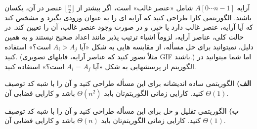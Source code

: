 \documentclass{article}
\begin{document}
آرایه 
$A[0\cdots n-1]$
 شامل «عنصر غالب» است، اگر بیشتر از 
$\lfloor\frac{n}{2}\rfloor$
عنصر در آن، یکسان باشند. الگوریتمی
کارا طراحی کنید که آرایه ای را به عنوان ورودی بگیرد و مشخص کند که آیا آرایه، عنصر غالب دارد یا خیر، و در 
صورت وجود عنصر غالب، آن را تعیین کند. در حالت کلی، عناصر آرایه، لزوماً اشیاء ترتیب پذیر مانند اعداد 
صحیح نیستند و به همین دلیل، نمیتوانید برای حل مسأله، از مقایسه هایی به شکل
 «آیا 
 $A_i>A_j$
  است؟» 
استفاده کنید. (مثلاً تصور کنید که عناصر آرایه، فایلهای تصویری GIF باشند.) اما شما میتوانید در الگوریتم از 
پرسشهایی به شکل «آیا 
$A_i=A_j$
 است؟» استفاده کنید.
\vspace{2.5pt}

\textbf{الف)}
الگوریتمی ساده اندیشانه
برای این مسأله طراحی کنید و آن را با شبه کد توصیف کنید. کارایی زمانی الگوریتم‌تان باید 
$\Theta(n^2)$
باشد و کارایی فضایی آن
$\Theta(1)$.

\textbf{ب)}
الگوریتمی تقلیل و حل برای این مسأله طراحی کنید
و آن را با شبه کد توصیف کنید.
کارایی زمانی الگوریتم‌تان باید 
$\Theta(n)$
باشد و کارایی فضایی آن
$\Theta(1)$.
\end{document}
